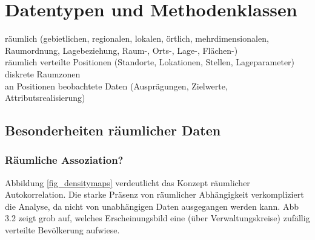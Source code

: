 \chapter{Datentypen und Methodenklassen}


räumlich (gebietlichen, regionalen, lokalen, örtlich, mehrdimensionalen, Raumordnung, Lagebeziehung, Raum-, Orts-, Lage-, Flächen-) \\

räumlich verteilte Positionen (Standorte, Lokationen, Stellen, Lageparameter) \\
diskrete Raumzonen \\

an Positionen beobachtete Daten (Ausprägungen, Zielwerte, Attributsrealisierung) 

\section{Besonderheiten räumlicher Daten}

\subsection*{Räumliche Assoziation?}
\label{subsec:tobler}

Abbildung \ref{fig_densitymaps} verdeutlicht das Konzept räumlicher Autokorrelation. Die starke Präsenz von räumlicher 
Abhängigkeit verkompliziert die Analyse, da nicht von unabhängigen Daten ausgegangen werden kann. Abb 3.2 zeigt grob auf,
welches Erscheinungsbild eine (über Verwaltungskreise) zufällig verteilte Bevölkerung aufwiese.

